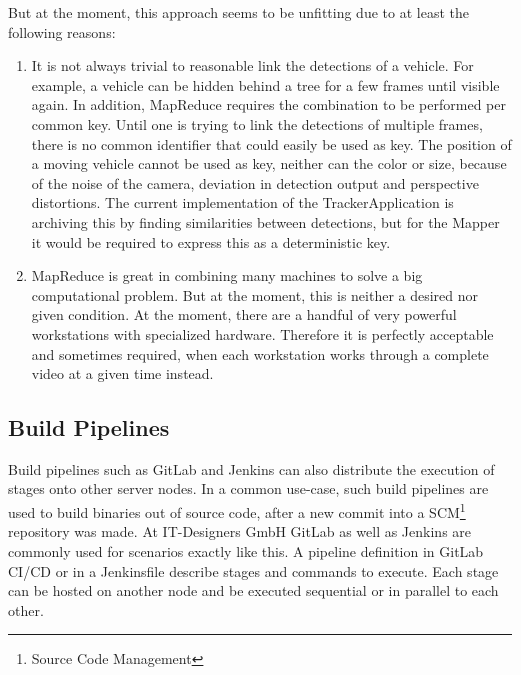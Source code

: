 But at the moment, this approach seems to be unfitting due to at least the following reasons:

\begin{enumerate}
	\item It is not always trivial to reasonable link the detections of a vehicle.
	For example, a vehicle can be hidden behind a tree for a few frames until visible again.
	In addition, MapReduce requires the combination to be performed per common key.
	Until one is trying to link the detections of multiple frames, there is no common identifier that could easily be used as key.
	The position of a moving vehicle cannot be used as key, neither can the color or size, because of the noise of the camera, deviation in detection output and perspective distortions.
	The current implementation of the TrackerApplication is archiving this by finding similarities between detections, but for the Mapper it would be required to express this as a deterministic key.
	\item MapReduce is great in combining many machines to solve a big computational problem.
	But at the moment, this is neither a desired nor given condition. At the moment, there are a handful of very powerful workstations with specialized hardware.
	Therefore it is perfectly acceptable and sometimes required, when each workstation works through a complete video at a given time instead.
\end{enumerate}

\subsection{Build Pipelines}

Build pipelines such as GitLab\cite{gitlab:main} and Jenkins\cite{jenkins:main} can also distribute the execution of stages onto other server nodes.
In a common use-case, such build pipelines are used to build binaries out of source code, after a new commit into a SCM\footnote{Source Code Management} repository was made.
At IT-Designers GmbH GitLab as well as Jenkins are commonly used for scenarios exactly like this.
A pipeline definition in GitLab CI/CD \cite{gitlab:ci:yaml} or in a Jenkinsfile \cite{jenkins:pipeline:jenkinsfile} describe stages and commands to execute.
Each stage can be hosted on another node and be executed sequential or in parallel to each other.

